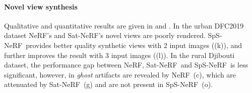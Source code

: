 \documentclass{isprs} %
\newcommand{\Nerf}{{NeRF}}
\newcommand{\OurNeRFShort}{{SpS-NeRF}}
\begin{document}
\paragraph{Novel view synthesis}
Qualitative and quantitative results are given in  and . In the urban DFC2019 dataset \Nerf's and Sat-\Nerf's novel views are poorly rendered. \OurNeRFShort~provides better quality synthetic views with 2 input images ((k)), and further improves the result with 3 input images ((l)).
In the rural Djibouti dataset, the performance gap between \Nerf, Sat-\Nerf~and \OurNeRFShort~is less significant, however, in  \textit{ghost} artifacts are revealed by \Nerf~(c), which are attenuated by Sat-\Nerf~(g) and are not present in \OurNeRFShort~(o).
\end{document}
